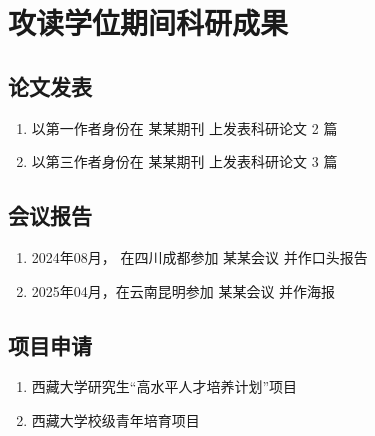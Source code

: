 \chapter{攻读学位期间科研成果}

\section*{论文发表}

\begin{enumerate}
	\item 
	以第一作者身份在 某某期刊 上发表科研论文 2 篇
	\item 
	以第三作者身份在 某某期刊 上发表科研论文 3 篇
\end{enumerate}

\section*{会议报告}
\begin{enumerate}
	\item
	2024年08月， 在四川成都参加 某某会议 并作口头报告
	\item 
	2025年04月，在云南昆明参加 某某会议 并作海报
	
\end{enumerate}

\section*{项目申请}
\begin{enumerate}
	\item
	西藏大学研究生“高水平人才培养计划”项目
	\item 
	西藏大学校级青年培育项目
\end{enumerate}


